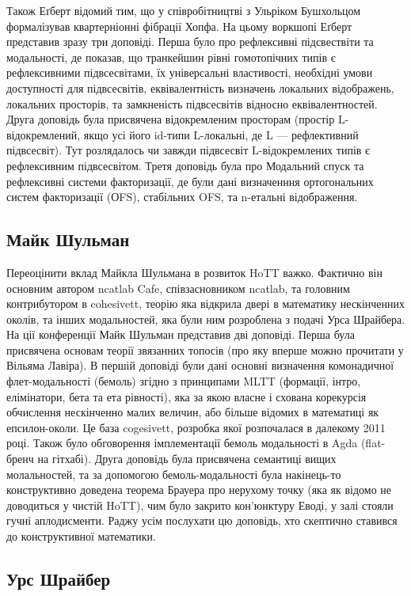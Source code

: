 Також Еґберт відомий тим, що у співробітництві з Ульріком Бушхольцом
формалізував квартерніонні фібрації Хопфа. На цьому воркшопі Еґберт
представив зразу три доповіді. Перша було про рефлексивні підсвествіти
та модальності, де показав, що транкейшин рівні гомотопічних типів є
рефлексивними підвсесвітами, їх універсальні властивості, необхідні
умови доступності для підвсесвітів, еквівалентність визначень
локальних відображень, локальних просторів, та замкненість
підвсесвітів відносно еквівалентностей. Друга доповідь була
присвячена відокремленим просторам (простір L-відокремлений,
якщо усі його id-типи L-локальні, де L --- рефлективний підвсесвіт).
Тут розлядалось чи завжди підвсесвіт L-відокремлених типів є рефлексивним
підвсесвітом. Третя доповідь була про Модальний спуск та рефлексивні
системи факторизації, де були дані визначенння ортогональних систем
факторизації (ОFS), стабільних OFS, та n-етальні відображення.

\subsection*{Майк Шульман}

Переоцінити вклад Майкла Шульмана в розвиток HoTT важко.
Фактично він основним автором ncatlab Cafe, співзасновником ncatlab,
та головним контрибутором в cohesivett, теорію яка відкрила двері в
математику нескінченних околів, та інших модальностей, яка були ним
розроблена з подачі Урса Шрайбера. На ції конференції Майк Шульман
представив дві доповіді. Перша була присвячена основам теорії звязанних
топосів (про яку вперше можно прочитати у Вільяма Лавіра). В першій
доповіді були дані основні визначення комонадичної флет-модальності
(бемоль) згідно з принципами MLTT (формації, інтро, елімінатори,
бета та ета рівності), яка за якою власне і схована корекурсія
обчислення нескінченно малих величин, або більше відомих в
математиці як епсилон-околи. Це база cogesivett, розробка якої
розпочалася в далекому 2011 році. Також було обговорення імплементації
бемоль модальності в Agda (flat-бренч на гітхабі). Друга доповідь була
присвячена семантиці вищих молальностей, та за допомогою бемоль-модальності
була накінець-то конструктивно доведена теорема Брауера про нерухому
точку (яка як відомо не доводиться у чистій HoTT), чим було закрито
кон'юнктуру Еводі, у залі стояли гучні аплодисменти. Раджу усім
послухати цю доповідь, хто скептично ставився до конструктивної математики.

\subsection*{Урс Шрайбер}

